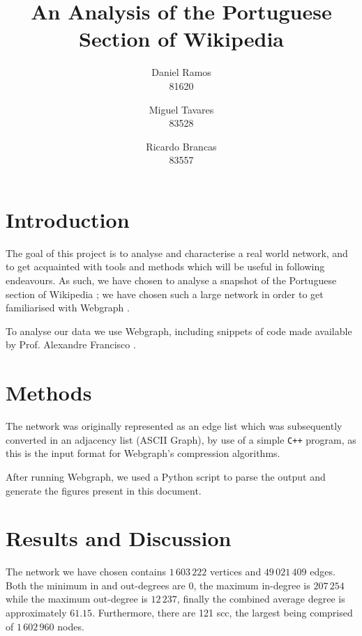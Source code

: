 \documentclass[9pt,a4paper,twocolumn]{article}
\title{An Analysis of the Portuguese Section of Wikipedia}
\author{Daniel Ramos \\ 81620 \and Miguel Tavares \\ 83528 \and Ricardo Brancas  \\ 83557}
\begin{document}
\maketitle

\section{Introduction}
The goal of this project is to analyse and characterise a real world network, and to  get acquainted with tools and methods which will be useful in following endeavours.
As such, we have chosen to analyse a snapshot of the Portuguese section of Wikipedia \cite{dataset};
we have chosen such a large network in order to get familiarised with Webgraph \cite{webgraph}.


To analyse our data we use Webgraph, including snippets of code made available
by Prof. Alexandre Francisco \cite{aplf}.

\section{Methods}
The network was originally represented as an edge list which was subsequently converted in an adjacency list (ASCII Graph), by use of a simple \texttt{C++} program, as this is the input
format for Webgraph's compression algorithms.

After running Webgraph, we used a Python script to parse the output and generate the figures present in this document.


\section{Results and Discussion}

The network we have chosen contains $1\,603\,222$ vertices and $49\,021\,409$ edges. Both the minimum in and out-degrees are $0$, the maximum in-degree is $207\,254$ while the maximum out-degree is $12\,237$, finally the combined average degree is approximately $61.15$. Furthermore, there are 121 \acrlong{scc}, the largest being comprised of $1\,602\,960$ nodes.
\vspace{1\baselineskip}
\end{document}
